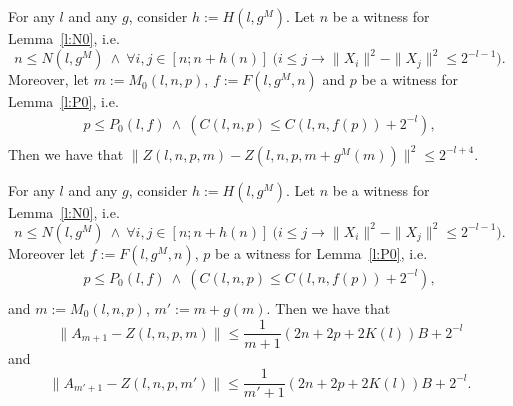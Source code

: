 \begin{lemma}\label{l:Zs}
For any $l$ and any $g$, consider $h:= H(l,g^M)$. Let
$n$ be a witness for Lemma~\ref{l:N0}, i.e. 
\[
n\leq N(l,g^M)\ \wedge\ \forall i,j\in[n;n+h(n)]\ 
\big( i\leq j\rightarrow \|X_i\|^2-\|X_j\|^2\leq 2^{-l-1} \big) . \tag{N} 
\]
Moreover, let $m:=M_0(l,n,p)$, $f:=F(l,g^M,n)$ and 
$p$ be a witness for Lemma~\ref{l:P0}, i.e. 
\begin{align*}
p\leq P_0(l,f)\ \wedge\ ( C(l,n,p)\leq C(l,n,f(p)) + 2^{-l}  ),  \tag{P}\\
\end{align*} 
Then we have that
$ \|Z(l,n,p,m) - Z( l,n,p,m+g^M(m) ) \|^2 \leq 2^{-l+4}.$
\end{lemma}

\begin{lemma}\label{l:ZA}
For any $l$ and any $g$, consider $h:= H(l,g^M)$. Let
$n$ be a witness for Lemma~\ref{l:N0}, i.e. 
\[
n\leq N(l,g^M)\ \wedge\ \forall i,j\in[n;n+h(n)]\ 
\big( i\leq j\rightarrow \|X_i\|^2-\|X_j\|^2\leq 2^{-l-1} \big) . \tag{N} 
\]
Moreover let $f:=F(l,g^M,n)$,
$p$ be a witness for Lemma~\ref{l:P0}, i.e. 
\begin{align*}
p\leq P_0(l,f)\ \wedge\ ( C(l,n,p)\leq C(l,n,f(p)) + 2^{-l}  ),  \tag{P}\\
\end{align*} 
and  $m:=M_0(l,n,p)$, $m':=m+g(m)$.
Then we have that
\[
 \|A_{m+1} - Z( l,n,p,m )\|\leq \frac{1}{m+1}(2n + 2p + 2K(l))B +2^{-l}
\]
and
\[
 \|A_{m'+1} - Z( l,n,p,m' )\|\leq \frac{1}{m'+1}(2n + 2p + 2K(l))B +2^{-l}.
\]
\end{lemma}


